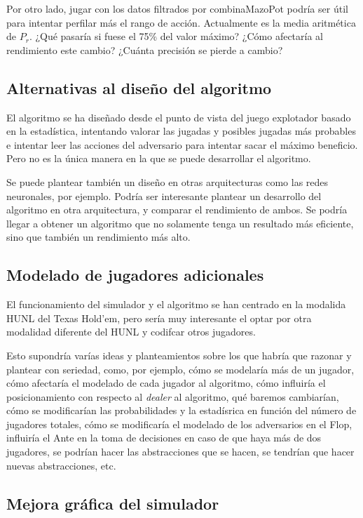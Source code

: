 Por otro lado, jugar con los datos filtrados por combinaMazoPot podría ser útil para intentar perfilar más el rango de acción. Actualmente es la media aritmética de $P_r$. ¿Qué pasaría si fuese el 75\% del valor máximo? ¿Cómo afectaría al rendimiento este cambio? ¿Cuánta precisión se pierde a cambio?

\subsection{Alternativas al diseño del algoritmo}

El algoritmo se ha diseñado desde el punto de vista del juego explotador basado en la estadística, intentando valorar las jugadas y posibles jugadas más probables e intentar leer las acciones del adversario para intentar sacar el máximo beneficio. Pero no es la única manera en la que se puede desarrollar el algoritmo.

Se puede plantear también un diseño en otras arquitecturas como las redes neuronales, por ejemplo. Podría ser interesante plantear un desarrollo del algoritmo en otra arquitectura, y comparar el rendimiento de ambos. Se podría llegar a obtener un algoritmo que no solamente tenga un resultado más eficiente, sino que también un rendimiento más alto.

\subsection{Modelado de jugadores adicionales}

El funcionamiento del simulador y el algoritmo se han centrado en la modalida HUNL del Texas Hold'em, pero sería muy interesante el optar por otra modalidad diferente del HUNL y codifcar otros jugadores. 

Esto supondría varías ideas y planteamientos sobre los que habría que razonar y plantear con seriedad, como, por ejemplo, cómo se modelaría más de un jugador,  cómo afectaría el modelado de cada jugador al algoritmo, cómo influiría el posicionamiento con respecto al \textit{dealer} al algoritmo, qué baremos cambiarían, cómo se modificarían las probabilidades y la estadísrica en función del número de jugadores totales, cómo se modificaría el modelado de los adversarios en el Flop, influiría el Ante en la toma de decisiones en caso de que haya más de dos jugadores,  se podrían hacer las abstracciones que se hacen, se tendrían que hacer nuevas abstracciones, etc.

\subsection{Mejora gráfica del simulador}

